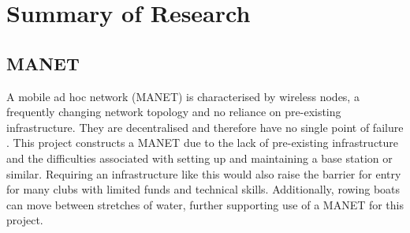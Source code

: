 \documentclass[12pt,a4paper]{report}
\begin{document}
\section{Summary of Research}
\subsection{MANET}
A mobile ad hoc network (MANET) is characterised by wireless nodes, a frequently changing network topology and no reliance on pre-existing infrastructure. They are decentralised and therefore have no single point of failure \cite{d2}.  This project constructs a MANET due to the lack of pre-existing infrastructure and the difficulties associated with setting up and maintaining a base station or similar. Requiring an infrastructure like this would also raise the barrier for entry for many clubs with limited funds and technical skills. Additionally, rowing boats can move between stretches of water, further supporting use of a MANET for this project.
\end{document}
